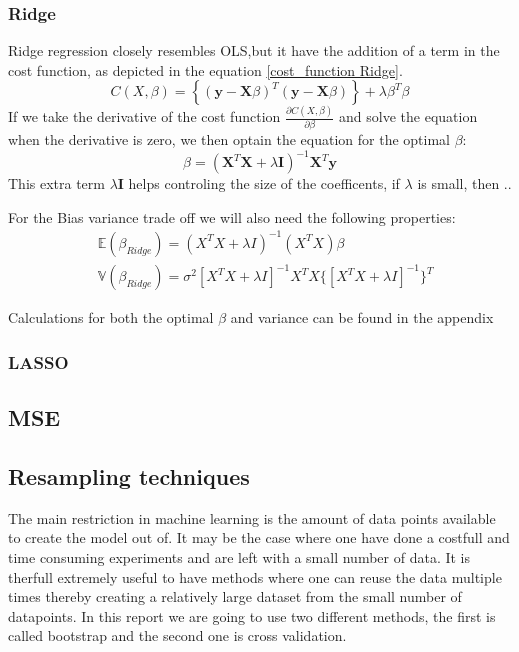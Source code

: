 \subsubsection{Ridge}
\noindent Ridge regression closely resembles OLS,but it have the addition of a term in the 
cost function, as depicted in the equation \eqref{cost_function Ridge}.
\begin{equation}
    C(X,\beta) =  \left\lbrace ( \textbf{y} - \textbf{X}\beta )^T (\textbf{y} - \textbf{X}\beta)\right\rbrace + \lambda \beta^T \beta \label{cost_function Ridge}
\end{equation}
If we take the derivative of the cost function $\frac{\partial C(X, \beta)}{\partial \beta}$ and 
solve the equation when the derivative is zero, we then optain the equation for the optimal $\beta$:
\begin{equation}
    \beta = (\textbf{X}^T \textbf{X} + \lambda \textbf{I})^{-1}\textbf{X}^T \textbf{y} \label{beta ridge}
\end{equation}
This extra term $\lambda \textbf{I}$ helps controling the size of the coefficents, if $\lambda$ is 
small, then ..

For the Bias variance trade off we will also need the following properties:
\begin{align}
    & \mathbb{E}(\beta_{Ridge}) = (X^T X + \lambda I )^{-1}(X^T X)\beta\\
    & \mathbb{V}(\beta_{Ridge}) = \sigma^2[X^T X + \lambda I]^{-1} X^T X \{[X^T X + \lambda I]^{-1}\}^T
\end{align}

Calculations for both the optimal $\beta$ and variance can be found in the appendix
\subsubsection{LASSO}

\subsection{MSE}


\subsection{Resampling techniques}

\noindent The main restriction in machine learning is 
the amount of data points available to create the model out of. It may be the case where one have
done a costfull and time consuming experiments and are left with a small number of data. 
It is therfull extremely useful to have methods where one can reuse the data multiple times
thereby creating a relatively large dataset from the small number of datapoints. In this report
we are going to use two different methods, the first is called bootstrap and the second one is cross validation.

